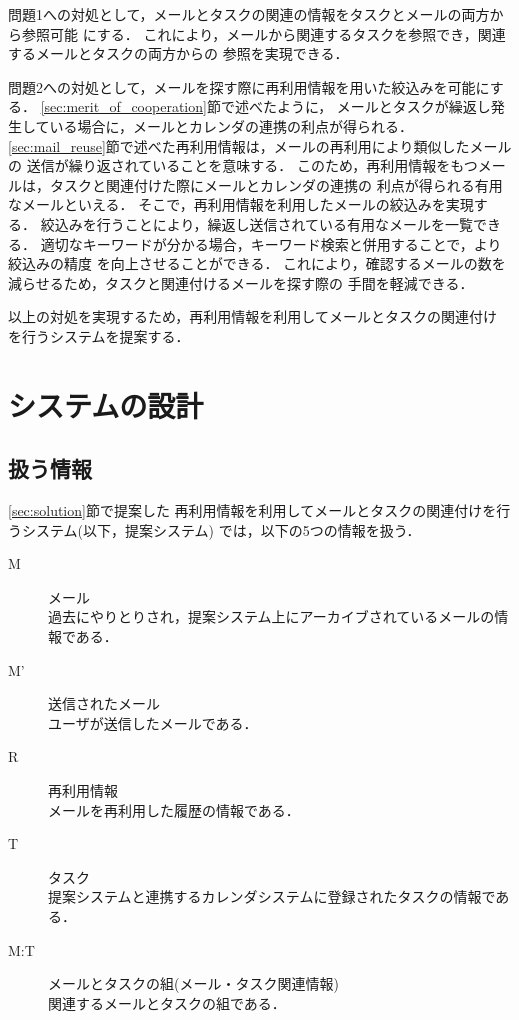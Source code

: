 \documentclass[submit,techreq,noauthor,dvipdfmx]{ipsj}
\begin{document}
問題1への対処として，メールとタスクの関連の情報をタスクとメールの両方から参照可能
にする．
これにより，メールから関連するタスクを参照でき，関連するメールとタスクの両方からの
参照を実現できる．

問題2への対処として，メールを探す際に再利用情報を用いた絞込みを可能にする．
\ref{sec:merit_of_cooperation}節で述べたように，
メールとタスクが繰返し発生している場合に，メールとカレンダの連携の利点が得られる．
\ref{sec:mail_reuse}節で述べた再利用情報は，メールの再利用により類似したメールの
送信が繰り返されていることを意味する．
このため，再利用情報をもつメールは，タスクと関連付けた際にメールとカレンダの連携の
利点が得られる有用なメールといえる．
そこで，再利用情報を利用したメールの絞込みを実現する．
絞込みを行うことにより，繰返し送信されている有用なメールを一覧できる．
適切なキーワードが分かる場合，キーワード検索と併用することで，より絞込みの精度
を向上させることができる．
これにより，確認するメールの数を減らせるため，タスクと関連付けるメールを探す際の
手間を軽減できる．

以上の対処を実現するため，再利用情報を利用してメールとタスクの関連付け
を行うシステムを提案する．






\section{システムの設計}\label{chap:system}

\subsection{扱う情報}\label{sec:system_structure}

\ref{sec:solution}節で提案した
再利用情報を利用してメールとタスクの関連付けを行うシステム(以下，提案システム)
では，以下の5つの情報を扱う．

\begin{description}
\item[M] メール\\
  過去にやりとりされ，提案システム上にアーカイブされているメールの情報である．
\item[M'] 送信されたメール\\
  ユーザが送信したメールである．
\item[R] 再利用情報\\
  メールを再利用した履歴の情報である．
\item[T] タスク\\
  提案システムと連携するカレンダシステムに登録されたタスクの情報である．
\item[M:T] メールとタスクの組(メール・タスク関連情報)\\
  関連するメールとタスクの組である．
\end{description}
\end{document}
